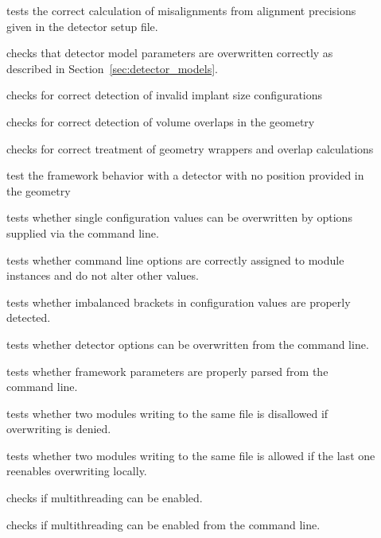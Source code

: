 \begin{description}
    \item[] tests the correct calculation of misalignments from alignment precisions given in the detector setup file.
    \item[] checks that detector model parameters are overwritten correctly as described in Section~\ref{sec:detector_models}.
    \item[] checks for correct detection of invalid implant size configurations
    \item[] checks for correct detection of volume overlaps in the geometry
    \item[] checks for correct treatment of geometry wrappers and overlap calculations
    \item[] test the framework behavior with a detector with no position provided in the geometry
    \item[] tests whether single configuration values can be overwritten by options supplied via the command line.
    \item[] tests whether command line options are correctly assigned to module instances and do not alter other values.
    \item[] tests whether imbalanced brackets in configuration values are properly detected.
    \item[] tests whether detector options can be overwritten from the command line.
    \item[] tests whether framework parameters are properly parsed from the command line.
    \item[] tests whether two modules writing to the same file is disallowed if overwriting is denied.
    \item[] tests whether two modules writing to the same file is allowed if the last one reenables overwriting locally.
    \item[] checks if multithreading can be enabled.
    \item[] checks if multithreading can be enabled from the command line.

\end{description}
